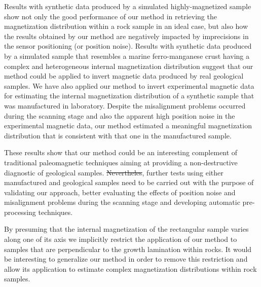 \documentclass[draft,gc]{agutex}
\providecommand{\DIFadd}[1]{{\protect\color{blue}\uwave{#1}}} %
\providecommand{\DIFdel}[1]{{\protect\color{red}\sout{#1}}}                      %
\providecommand{\DIFaddbegin}{} %
\providecommand{\DIFaddend}{} %
\providecommand{\DIFdelbegin}{} %
\providecommand{\DIFdelend}{} %
\begin{document}
\begin{article}
Results with synthetic data produced by a simulated highly-magnetized 
sample show not only the good performance of 
our method in retrieving the magnetization distribution within a 
rock sample in an ideal case, but also how the results obtained by our 
method are negatively impacted by imprecisions in the sensor positioning
(or position noise).
Results with synthetic data produced by a simulated sample that 
resembles a marine ferro-manganese crust having a complex and heterogeneous 
internal magnetization distribution suggest that our method could be
applied to invert magnetic data produced by real geological samples.
We have also applied our method to invert experimental magnetic data
for estimating the internal magnetization 
distribution of a synthetic sample that was manufactured in 
laboratory.
Despite the misalignment problems occurred during the scanning stage
and also the apparent high position noise in the experimental magnetic
data, our method estimated a meaningful magnetization distribution that 
is consistent with that one in the manufactured sample.

These results show that our method could be an interesting complement
of traditional paleomagnetic techniques aiming at providing a 
non-destructive diagnostic of geological samples.
\DIFdelbegin \DIFdel{Nevertheles}\DIFdelend \DIFaddbegin \DIFadd{Nevertheless}\DIFaddend , further tests using either manufactured and geological samples 
need to be carried out with the purpose of validating our approach,
better evaluating the effects of position noise
and misalignment problems during the scanning stage and
\DIFaddbegin \DIFadd{also }\DIFaddend developing automatic pre-processing techniques.
\DIFaddbegin 

\DIFaddend By presuming that the internal magnetization of the rectangular 
sample varies along one of its axis we implicitly restrict the
application of our method to samples that are perpendicular
to the growth lamination within rocks.
It would be interesting to generalize our method in order to
remove this restriction and allow its application to estimate
complex magnetization distributions within rock samples.



\end{article}
\end{document}
